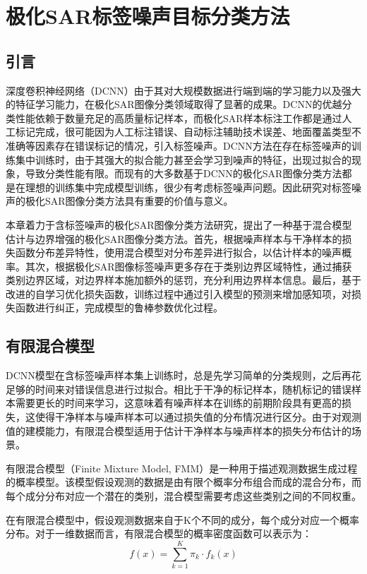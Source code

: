 \chapter{极化SAR标签噪声目标分类方法}
\section{引言}
深度卷积神经网络（DCNN）由于其对大规模数据进行端到端的学习能力以及强大的特征学习能力，在极化SAR图像分类领域取得了显著的成果。DCNN的优越分类性能依赖于数量充足的高质量标记样本，而极化SAR样本标注工作都是通过人工标记完成，很可能因为人工标注错误、自动标注辅助技术误差、地面覆盖类型不准确等因素存在错误标记的情况，引入标签噪声。DCNN方法在存在标签噪声的训练集中训练时，由于其强大的拟合能力甚至会学习到噪声的特征，出现过拟合的现象，导致分类性能有限。而现有的大多数基于DCNN的极化SAR图像分类方法都是在理想的训练集中完成模型训练，很少有考虑标签噪声问题。因此研究对标签噪声的极化SAR图像分类方法具有重要的价值与意义。

本章着力于含标签噪声的极化SAR图像分类方法研究，提出了一种基于混合模型估计与边界增强的极化SAR图像分类方法。首先，根据噪声样本与干净样本的损失函数分布差异特性，使用混合模型对分布差异进行拟合，以估计样本的噪声概率。其次，根据极化SAR图像标签噪声更多存在于类别边界区域特性，通过捕获类别边界区域，对边界样本施加额外的惩罚，充分利用边界样本信息。最后，基于改进的自学习优化损失函数，训练过程中通过引入模型的预测来增加感知项，对损失函数进行纠正，完成模型的鲁棒参数优化过程。

\section{有限混合模型}
DCNN模型在含标签噪声样本集上训练时，总是先学习简单的分类规则，之后再花足够的时间来对错误信息进行过拟合。相比于干净的标记样本，随机标记的错误样本需要更长的时间来学习，这意味着有噪声样本在训练的前期阶段具有更高的损失，这使得干净样本与噪声样本可以通过损失值的分布情况进行区分。由于对观测值的建模能力，有限混合模型适用于估计干净样本与噪声样本的损失分布估计的场景。

有限混合模型（Finite Mixture Model, FMM）是一种用于描述观测数据生成过程的概率模型。该模型假设观测的数据是由有限个概率分布组合而成的混合分布，而每个成分分布对应一个潜在的类别，混合模型需要考虑这些类别之间的不同权重。

在有限混合模型中，假设观测数据来自于K个不同的成分，每个成分对应一个概率分布。对于一维数据而言，有限混合模型的概率密度函数可以表示为：
\begin{equation}
    f(x)=\sum_{k=1}^{K}\pi_k \cdot f_k(x)
\end{equation}

